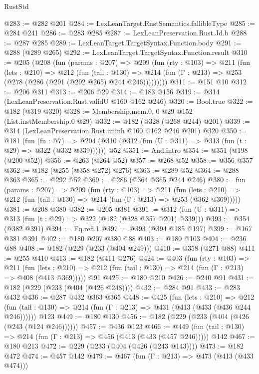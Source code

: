 \begin{lexlean}{RustStd}
\begin{coremodule}
@283 := @282 @201
@284 := LexLeanTarget.RustSemantics.fallibleType
@285 := @284 @241
@286 := @283 @285
@287 := LexLeanPreservation.Rust.Jd.b
@288 := @287 @285
@289 := LexLeanTarget.TargetSyntax.Function.body
@291 := @288 (@289 @265)
@292 := LexLeanTarget.TargetSyntax.Function.result
@310 := @205
    (@208
      (fun (params : @207) =>
      @209
        (fun (rty : @103) =>
        @211
          (fun (lets : @210) =>
          @212
            (fun (tail : @130) =>
            @214 (fun (Γ : @213) => @253 (@278 (@286 (@291 (@292 @265) @244 @246)))))))))
@311 := @151 @10
@312 := @206 @311
@313 := @206 @29
@314 := @183 @156
@319 := @314 (LexLeanPreservation.Rust.validU @160 @162 @246)
@320 := Bool.true
@322 := @182 (@319 @320)
@328 := Membership.mem.{0, 0} @29 @152 (List.instMembership.{0} @29)
@332 := @182 (@328 (@268 @244) @201)
@339 := @314 (LexLeanPreservation.Rust.uninh @160 @162 @246 @201) @320
@350 := @181
    (fun (fn : @7) =>
    @204 (@310 (@312 (fun (U : @311) => @313 (fun (t : @29) => @322 (@332 @339))))))
    @52
@351 := And.intro
@354 := @351 (@198 (@200 @52))
@356 := @263 (@264 @52)
@357 := @268 @52
@358 := @356 @357
@362 := @182 (@255 (@358 @272) @276)
@363 := @289 @52
@364 := @288 @363
@365 := @292 @52
@369 := @286 (@364 @365 @244 @246)
@380 := fun (params : @207) =>
  @209
    (fun (rty : @103) =>
    @211
      (fun (lets : @210) => @212 (fun (tail : @130) => @214 (fun (Γ : @213) => @253 (@362 @369)))))
@381 := @208 @380
@382 := @205 @381
@391 := @312 (fun (U : @311) => @313 (fun (t : @29) => @322 (@182 (@328 @357 @201) @339)))
@393 := @354 (@382 @391)
@394 := Eq.refl.{1}
@397 := @393 (@394 @185 @197)
@399 := @167 @381 @391
@402 := @180 @207 @380 @88
@403 := @180 @103
@404 := @236 @88
@408 := @182 (@229 (@233 (@404 @249)))
@410 := @358 (@271 @88)
@411 := @255 @410
@413 := @182 (@411 @276)
@424 := @403
    (fun (rty : @103) =>
    @211
      (fun (lets : @210) => @212 (fun (tail : @130) => @214 (fun (Γ : @213) => @408 (@413 @369)))))
    @91
@425 := @180 @210
@426 := @240 @91
@431 := @182 (@229 (@233 (@404 (@426 @248))))
@432 := @284 @91
@433 := @283 @432
@436 := @287 @432 @363 @365
@448 := @425
    (fun (lets : @210) =>
    @212 (fun (tail : @130) => @214 (fun (Γ : @213) => @431 (@413 (@433 (@436 @244 @246))))))
    @123
@449 := @180 @130
@456 := @182 (@229 (@233 (@404 (@426 (@243 (@124 @246))))))
@457 := @436 @123
@466 := @449 (fun (tail : @130) => @214 (fun (Γ : @213) => @456 (@413 (@433 (@457 @246))))) @142
@467 := @180 @213
@472 := @229 (@233 (@404 (@426 (@243 @143))))
@473 := @182 @472
@474 := @457 @142
@479 := @467 (fun (Γ : @213) => @473 (@413 (@433 @474)))

\end{coremodule}
\end{lexlean}
